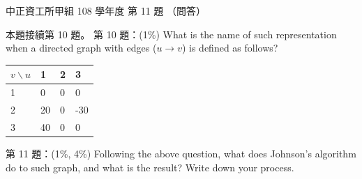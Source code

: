 \begin{pastexam}[label={px:ccu-108-swa-10}]{中正資工所甲組 108 學年度 第 11 題}
（問答）

本題接續第 10 題。 第 10 題：(1\%) What is the name of such representation when a directed graph
with edges ($u\to v$) is defined as follows?

\begin{center}
\begin{tabular}{|l|l|l|l|}\hline
$v \backslash u$ & 1 & 2 & 3\\\hline
1 & 0 & 0 & 0\\\hline
2 & 20 & 0 & -30\\\hline
3 & 40 & 0 & 0\\\hline
\end{tabular}
\end{center}

第 11 題：(1\%, 4\%) Following the above question, what does Johnson's algorithm do to such graph,
and what is the result? Write down your process.
\end{pastexam}

